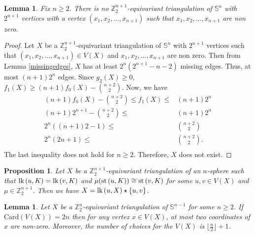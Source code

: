 \documentclass[11pt]{amsart}
\numberwithin{equation}{section}
\newtheorem{lemma}[theorem]{Lemma}
\newtheorem{prop}[theorem]{Proposition}
\theoremstyle{definition}
\newcommand{\st}{\mbox{\upshape st}\,}
\newcommand{\lk}{\mbox{\upshape lk}\,}
\newcommand{\Sp}{\mathbb{S}}
\def \bb{\mathbb}
\def \ZZ{{\bb{Z}}}
\begin{document}
\begin{lemma}\label{lem6}
 Fix $n\geq 2$. There is no $\ZZ_2^{n+1}$-equivariant triangulation of $\Sp^n$ with $2^{n+1}$ vertices with a
vertex $(x_1,x_2,\dots,x_{n+1})$ such that $x_1,x_2,\dots, x_{n+1}$ are non zero.
\end{lemma}
\begin{proof}
Let $X$ be a $\ZZ_2^{n+1}$-equivariant triangulation of $\Sp^n$ with $2^{n+1}$ vertices such that
$(x_1,x_2,\dots,x_{n+1})\in V(X)$ and $x_1, x_2, \dots,  x_{n+1}$ are non zero.  Then from Lemma \ref{missingedges}, $X$ has at least $2^{n}(2^{n+1}-n-2)$ missing edges. Thus, at most $(n+1)2^n$ edges. Since $g_2(X)\geq 0$, $f_1(X)\geq (n+1)f_0(X)-\binom{n+2}{2}$.
Now, we have 
\begin{align*}
  (n+1)f_0(X)-\binom{n+2}{2} \leq  f_1(X)\leq & (n+1)2^n\\
  (n+1)2^{n+1}-\binom{n+2}{2}\leq & (n+1)2^n\\
  2^n((n+1)2-1)\leq &\binom{n+2}{2}\\
  2^n(2n+1)\leq &\binom{n+2}{2}. \\
    \end{align*}
   The last inequality  does not hold for $n\geq 2$. Therefore,  $X$ does not exist.
\end{proof}






\begin{prop}\label{suspension}
Let $X$ be a $\ZZ_2^{n+1}$-equivariant triangulation of an $n$-sphere such that $\lk(u, K) = \lk(v, K)$ and $\mu(\st(u, K)) \cong \st(v, K)$ for some $u, v \in V(X)$ and $\mu\in \ZZ_2^{n+1}$. Then we have $X = \lk(u,X) \star \{u, v\}$.
\end{prop}

\begin{lemma}\label{twononzero}
    Let $X$ be a $\ZZ^{n}_2$-equivariant triangulation of $\Sp^{n-1}$ for some $n\geq 2$. If $\mathrm{Card}(V(X))=2n$ then for any vertex $x\in V(X)$, at most two coordinates of $x$ are non-zero. Moreover, the number of choices for the $V(X)$ is $\lfloor\frac{n}{2}\rfloor +1$.
\end{lemma}
\end{document}
